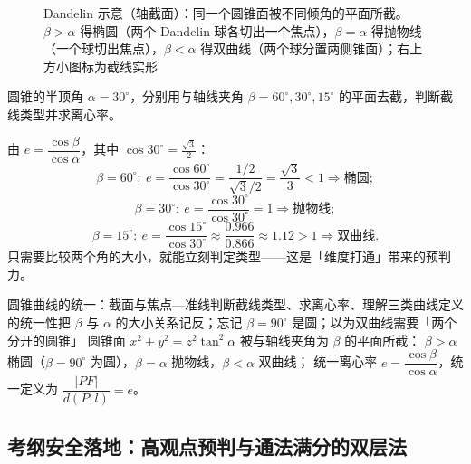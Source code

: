 \begin{explore}
\begin{figure}[htbp]
  \caption{Dandelin 示意（轴截面）：同一个圆锥面被不同倾角的平面所截。$\beta>\alpha$ 得椭圆（两个 Dandelin 球各切出一个焦点），$\beta=\alpha$ 得抛物线（一个球切出焦点），$\beta<\alpha$ 得双曲线（两个球分置两侧锥面）；右上方小图标为截线实形}
  \label{fig:dandelin}
\end{figure}

\begin{example}
圆锥的半顶角 $\alpha=30^\circ$，分别用与轴线夹角 $\beta=60^\circ,30^\circ,15^\circ$ 的平面去截，判断截线类型并求离心率。
\end{example}
\begin{solution}
由 $e=\dfrac{\cos\beta}{\cos\alpha}$，其中 $\cos30^\circ=\frac{\sqrt3}{2}$：
\[
  \beta=60^\circ:\ e=\frac{\cos60^\circ}{\cos30^\circ}=\frac{1/2}{\sqrt3/2}=\frac{\sqrt3}{3}<1\Rightarrow\text{椭圆};
\]
\[
  \beta=30^\circ:\ e=\frac{\cos30^\circ}{\cos30^\circ}=1\Rightarrow\text{抛物线};
\]
\[
  \beta=15^\circ:\ e=\frac{\cos15^\circ}{\cos30^\circ}\approx\frac{0.966}{0.866}\approx1.12>1\Rightarrow\text{双曲线}.
\]
只需要比较两个角的大小，就能立刻判定类型——这是「维度打通」带来的预判力。
\end{solution}

\begin{conccard}[二级]{圆锥曲线的统一：截面与焦点—准线}{判断截线类型、求离心率、理解三类曲线定义的统一性}{把 $\beta$ 与 $\alpha$ 的大小关系记反；忘记 $\beta=90^\circ$ 是圆；以为双曲线需要「两个分开的圆锥」}
圆锥面 $x^2+y^2=z^2\tan^2\alpha$ 被与轴线夹角为 $\beta$ 的平面所截：
$\beta>\alpha$ 椭圆（$\beta=90^\circ$ 为圆），$\beta=\alpha$ 抛物线，$\beta<\alpha$ 双曲线；
统一离心率 $e=\dfrac{\cos\beta}{\cos\alpha}$，统一定义为 $\dfrac{|PF|}{d(P,l)}=e$。
\end{conccard}

\subsection{考纲安全落地：高观点预判与通法满分的双层法}


\end{explore}
